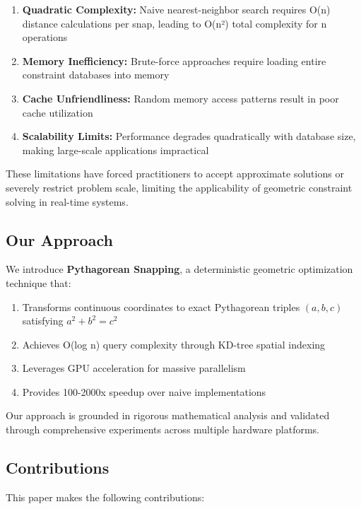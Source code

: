 \documentclass{article}
\begin{document}
\begin{enumerate}
    \item \textbf{Quadratic Complexity:} Naive nearest-neighbor search requires O(n) distance calculations per snap, leading to O(n²) total complexity for n operations
    \item \textbf{Memory Inefficiency:} Brute-force approaches require loading entire constraint databases into memory
    \item \textbf{Cache Unfriendliness:} Random memory access patterns result in poor cache utilization
    \item \textbf{Scalability Limits:} Performance degrades quadratically with database size, making large-scale applications impractical
\end{enumerate}

These limitations have forced practitioners to accept approximate solutions or severely restrict problem scale, limiting the applicability of geometric constraint solving in real-time systems.

\subsection{Our Approach}

We introduce \textbf{Pythagorean Snapping}, a deterministic geometric optimization technique that:

\begin{enumerate}
    \item Transforms continuous coordinates to exact Pythagorean triples $(a, b, c)$ satisfying $a^2 + b^2 = c^2$
    \item Achieves O(log n) query complexity through KD-tree spatial indexing
    \item Leverages GPU acceleration for massive parallelism
    \item Provides 100-2000x speedup over naive implementations
\end{enumerate}

Our approach is grounded in rigorous mathematical analysis and validated through comprehensive experiments across multiple hardware platforms.

\subsection{Contributions}

This paper makes the following contributions:
\end{document}

